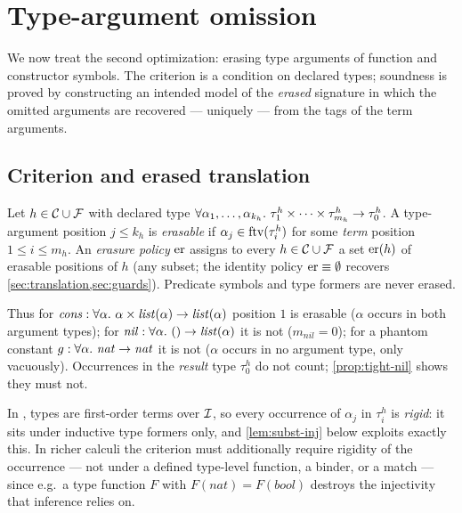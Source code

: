 \section{Type-argument omission}
\label{sec:typeargs}

We now treat the second optimization: erasing type arguments of function
and constructor symbols.  The criterion is a condition on declared types;
soundness is proved by constructing an intended model of the \emph{erased}
signature in which the omitted arguments are recovered --- uniquely ---
from the tags of the term arguments.

\subsection{Criterion and erased translation}

\begin{definition}
  \label{def:erasable}
  Let $h \in \mathcal{C} \cup \mathcal{F}$ with declared type
  $\forall\alpha_1,\dots,\alpha_{k_h}.\ \tau^h_1 \times \dots \times \tau^h_{m_h}
  \rightarrow \tau^h_0$.  A type-argument position $j \le k_h$ is
  \emph{erasable} if $\alpha_j \in \mathrm{ftv}(\tau^h_i)$ for some \emph{term}
  position $1 \le i \le m_h$.  An \emph{erasure policy} $\mathrm{er}$ assigns to
  every $h \in \mathcal{C} \cup \mathcal{F}$ a set $\mathrm{er}(h)$ of erasable positions of
  $h$ (any subset; the identity policy $\mathrm{er} \equiv \emptyset$ recovers
  \cref{sec:translation,sec:guards}).  Predicate symbols and type formers
  are never erased.
\end{definition}

Thus for $\mathit{cons} : \forall\alpha.\ \alpha \times
\mathit{list}(\alpha) \arr \mathit{list}(\alpha)$ position $1$ is
erasable ($\alpha$ occurs in both argument types); for
$\mathit{nil} : \forall\alpha.\ () \rightarrow \mathit{list}(\alpha)$ it is not
($m_{\mathit{nil}} = 0$); for a phantom constant
$g : \forall\alpha.\ \mathit{nat} \arr \mathit{nat}$ it is not
($\alpha$ occurs in no argument type, only vacuously).  Occurrences in the
\emph{result} type $\tau^h_0$ do not count; \cref{prop:tight-nil} shows
they must not.

\begin{remark}[Rigidity]
  \label{rem:rigidity}
  In \Frag, types are first-order terms over $\mathcal{I}$, so every occurrence
  of $\alpha_j$ in $\tau^h_i$ is \emph{rigid}: it sits under inductive
  type formers only, and \cref{lem:subst-inj} below exploits exactly this.
  In richer calculi the criterion must additionally require rigidity of
  the occurrence --- not under a defined type-level function, a binder, or
  a match --- since e.g.\ a type function $F$ with $F(\mathit{nat}) =
  F(\mathit{bool})$ destroys the injectivity that inference relies on.
\end{remark}

